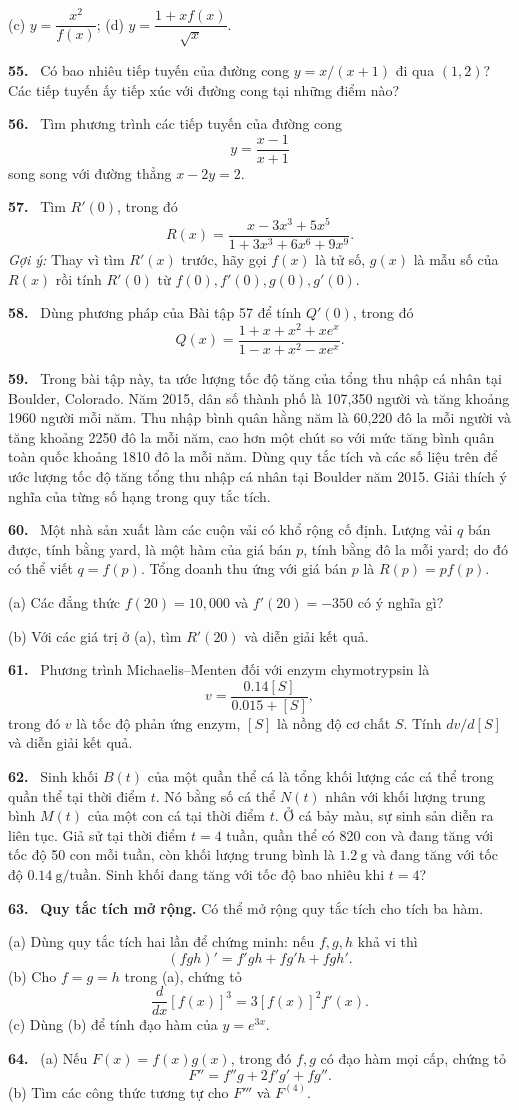\documentclass[12pt,a4paper]{article}
\newcommand{\bt}[1]{\par\smallskip\noindent\textbf{#1.}\ }
\begin{document}
(c) $y=\dfrac{x^2}{f(x)}$; \qquad (d) $y=\dfrac{1+xf(x)}{\sqrt{x}}$.
\bt{55} Có bao nhiêu tiếp tuyến của đường cong $y=x/(x+1)$ đi qua $(1,2)$? Các tiếp tuyến ấy tiếp xúc với đường cong tại những điểm nào?
\bt{56} Tìm phương trình các tiếp tuyến của đường cong
\[y=\frac{x-1}{x+1}\]
song song với đường thẳng $x-2y=2$.
\bt{57} Tìm $R'(0)$, trong đó
\[R(x)=\frac{x-3x^3+5x^5}{1+3x^3+6x^6+9x^9}.\]
\textit{Gợi ý:} Thay vì tìm $R'(x)$ trước, hãy gọi $f(x)$ là tử số, $g(x)$ là mẫu số của $R(x)$ rồi tính $R'(0)$ từ $f(0),f'(0),g(0),g'(0)$.
\bt{58} Dùng phương pháp của Bài tập 57 để tính $Q'(0)$, trong đó
\[Q(x)=\frac{1+x+x^2+xe^x}{1-x+x^2-xe^x}.\]
\bt{59} Trong bài tập này, ta ước lượng tốc độ tăng của tổng thu nhập cá nhân tại Boulder, Colorado. Năm 2015, dân số thành phố là 107,350 người và tăng khoảng 1960 người mỗi năm. Thu nhập bình quân hằng năm là 60,220 đô la mỗi người và tăng khoảng 2250 đô la mỗi năm, cao hơn một chút so với mức tăng bình quân toàn quốc khoảng 1810 đô la mỗi năm. Dùng quy tắc tích và các số liệu trên để ước lượng tốc độ tăng tổng thu nhập cá nhân tại Boulder năm 2015. Giải thích ý nghĩa của từng số hạng trong quy tắc tích.
\bt{60} Một nhà sản xuất làm các cuộn vải có khổ rộng cố định. Lượng vải $q$ bán được, tính bằng yard, là một hàm của giá bán $p$, tính bằng đô la mỗi yard; do đó có thể viết $q=f(p)$. Tổng doanh thu ứng với giá bán $p$ là $R(p)=pf(p)$.

(a) Các đẳng thức $f(20)=10{,}000$ và $f'(20)=-350$ có ý nghĩa gì?

(b) Với các giá trị ở (a), tìm $R'(20)$ và diễn giải kết quả.
\bt{61} Phương trình Michaelis–Menten đối với enzym chymotrypsin là
\[v=\frac{0.14[S]}{0.015+[S]},\]
trong đó $v$ là tốc độ phản ứng enzym, $[S]$ là nồng độ cơ chất $S$. Tính $dv/d[S]$ và diễn giải kết quả.
\bt{62} Sinh khối $B(t)$ của một quần thể cá là tổng khối lượng các cá thể trong quần thể tại thời điểm $t$. Nó bằng số cá thể $N(t)$ nhân với khối lượng trung bình $M(t)$ của một con cá tại thời điểm $t$. Ở cá bảy màu, sự sinh sản diễn ra liên tục. Giả sử tại thời điểm $t=4$ tuần, quần thể có 820 con và đang tăng với tốc độ 50 con mỗi tuần, còn khối lượng trung bình là $1.2\ \mathrm g$ và đang tăng với tốc độ $0.14\ \mathrm{g/tuần}$. Sinh khối đang tăng với tốc độ bao nhiêu khi $t=4$?
\bt{63} \textbf{Quy tắc tích mở rộng.} Có thể mở rộng quy tắc tích cho tích ba hàm.

(a) Dùng quy tắc tích hai lần để chứng minh: nếu $f,g,h$ khả vi thì
\[(fgh)'=f'gh+fg'h+fgh'.\]
(b) Cho $f=g=h$ trong (a), chứng tỏ
\[\frac{d}{dx}[f(x)]^3=3[f(x)]^2f'(x).\]
(c) Dùng (b) để tính đạo hàm của $y=e^{3x}$.
\bt{64} (a) Nếu $F(x)=f(x)g(x)$, trong đó $f,g$ có đạo hàm mọi cấp, chứng tỏ
\[F''=f''g+2f'g'+fg''.\]
(b) Tìm các công thức tương tự cho $F'''$ và $F^{(4)}$.
\end{document}
